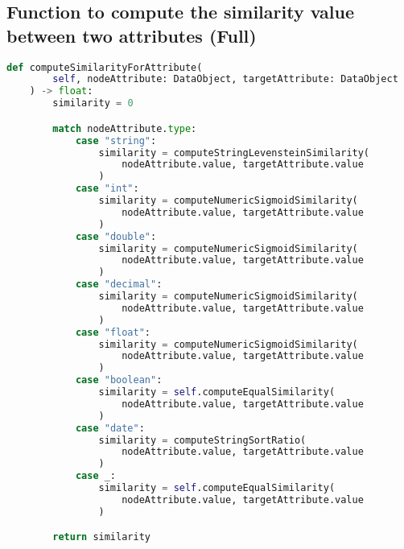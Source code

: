 \clearpage
\subsection{Function to compute the similarity value between two attributes (Full)\label{annex:comp-sim-att-full}}
\begin{lstlisting}[language=Python, caption=Function to compute the similarity value between two attributes, label={lst:comp-sim-att}]
def computeSimilarityForAttribute(
        self, nodeAttribute: DataObject, targetAttribute: DataObject
    ) -> float:
        similarity = 0

        match nodeAttribute.type:
            case "string":
                similarity = computeStringLevensteinSimilarity(
                    nodeAttribute.value, targetAttribute.value
                )
            case "int":
                similarity = computeNumericSigmoidSimilarity(
                    nodeAttribute.value, targetAttribute.value
                )
            case "double":
                similarity = computeNumericSigmoidSimilarity(
                    nodeAttribute.value, targetAttribute.value
                )
            case "decimal":
                similarity = computeNumericSigmoidSimilarity(
                    nodeAttribute.value, targetAttribute.value
                )
            case "float":
                similarity = computeNumericSigmoidSimilarity(
                    nodeAttribute.value, targetAttribute.value
                )
            case "boolean":
                similarity = self.computeEqualSimilarity(
                    nodeAttribute.value, targetAttribute.value
                )
            case "date":
                similarity = computeStringSortRatio(
                    nodeAttribute.value, targetAttribute.value
                )
            case _:
                similarity = self.computeEqualSimilarity(
                    nodeAttribute.value, targetAttribute.value
                )

        return similarity
\end{lstlisting}